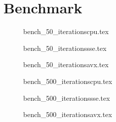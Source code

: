 \documentclass[a4paper]{article}
\begin{document}
\section{Benchmark}

\begin{figure}[!htb]
{bench_50_iterationscpu.tex}
\end{figure}
\begin{figure}[!htb]
{bench_50_iterationssse.tex}
\end{figure}
\begin{figure}[!htb]
{bench_50_iterationsavx.tex}
\end{figure}

\begin{figure}[!htb]
{bench_500_iterationscpu.tex}
\end{figure}
\begin{figure}[!htb]
{bench_500_iterationssse.tex}
\end{figure}
\begin{figure}[!htb]
{bench_500_iterationsavx.tex}
\end{figure}
\end{document}
